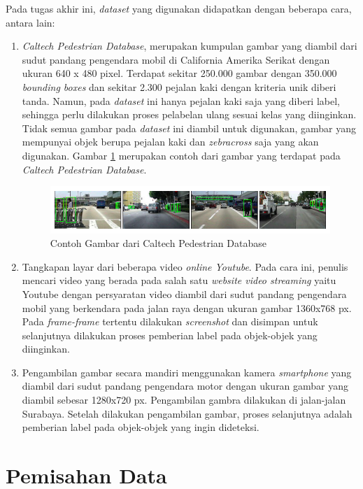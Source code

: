 Pada tugas akhir ini, \textit{dataset} yang digunakan didapatkan dengan beberapa cara, antara lain:
	\begin{enumerate}
		\item \textit{Caltech Pedestrian Database}, merupakan kumpulan gambar yang diambil dari sudut pandang pengendara mobil di California Amerika Serikat dengan ukuran 640 x 480 pixel. Terdapat sekitar 250.000 gambar dengan 350.000 \textit{bounding boxes} dan sekitar 2.300 pejalan kaki dengan kriteria unik diberi tanda. Namun, pada \textit{dataset} ini hanya pejalan kaki saja yang diberi label, sehingga perlu dilakukan proses pelabelan ulang sesuai kelas yang diinginkan. Tidak semua gambar pada \textit{dataset} ini diambil untuk digunakan, gambar yang mempunyai objek berupa pejalan kaki dan \textit{zebracross} saja yang akan digunakan. Gambar \ref{fig:caltech} merupakan contoh dari gambar yang terdapat pada \textit{Caltech Pedestrian Database}.
		\begin{figure}[ht]
			\centering
			\includegraphics[scale=0.35]{gambar/caltech.png}
			\caption{Contoh Gambar dari Caltech Pedestrian Database}
			\label{fig:caltech}
		\end{figure} 
		
		\item Tangkapan layar dari beberapa video \textit{online Youtube}. Pada cara ini, penulis mencari video yang berada pada salah satu \textit{website video streaming} yaitu Youtube dengan persyaratan video diambil dari sudut pandang pengendara mobil yang berkendara pada jalan raya dengan ukuran gambar 1360x768 px. Pada \textit{frame-frame} tertentu dilakukan \textit{screenshot} dan disimpan untuk selanjutnya dilakukan proses pemberian label pada objek-objek yang diinginkan.
		
		\item Pengambilan gambar secara mandiri menggunakan kamera \textit{smartphone} yang diambil dari sudut pandang pengendara motor dengan ukuran gambar yang diambil sebesar 1280x720 px. Pengambilan gambra dilakukan di jalan-jalan Surabaya. Setelah dilakukan pengambilan gambar, proses selanjutnya adalah pemberian label pada objek-objek yang ingin dideteksi.
	\end{enumerate}

\section{Pemisahan Data}
\label{sec:pemisahandata}

